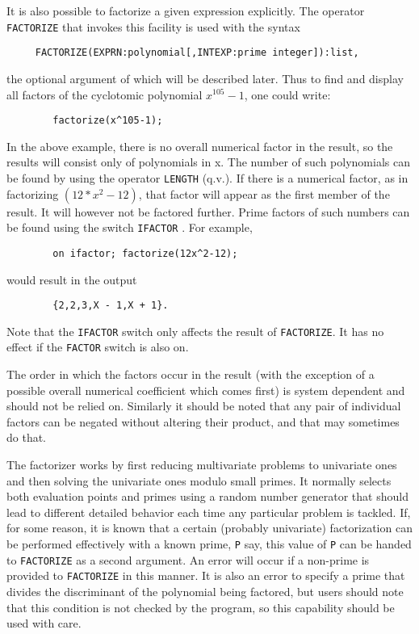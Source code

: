 It is also possible to factorize a given expression explicitly.  The
operator {\tt FACTORIZE}  that invokes this facility is
used with the syntax
\begin{verbatim}
     FACTORIZE(EXPRN:polynomial[,INTEXP:prime integer]):list,
\end{verbatim}
the optional argument of which will be described later. Thus to find and
display all factors of the cyclotomic polynomial $x^{105}-1$, one could
write:
\begin{verbatim}
        factorize(x^105-1);
\end{verbatim}
In the above example, there is no overall numerical factor in the result,
so the results will consist only of polynomials in x.  The number of such
polynomials can be found by using the operator {\tt LENGTH} 
(q.v.).  If there is a numerical factor, as in factorizing
$(12*x^{2}-12)$, that factor will appear as the first member of the
result.  It will however not be factored further.  Prime factors of such
numbers can be found using the switch {\tt IFACTOR} .  For
example,
\begin{verbatim}
        on ifactor; factorize(12x^2-12);
\end{verbatim}
would result in the output
\begin{verbatim}
        {2,2,3,X - 1,X + 1}.
\end{verbatim}
Note that the {\tt IFACTOR} switch only affects the result of {\tt FACTORIZE}.
It has no effect if the {\tt FACTOR}  switch is also on.

The order in which the factors occur in the result (with the exception of
a possible overall numerical coefficient which comes first) is system
dependent and should not be relied on. Similarly it should be noted that
any pair of individual factors can be negated without altering their
product, and that {\REDUCE} may sometimes do that.

The factorizer works by first reducing multivariate problems to univariate
ones and then solving the univariate ones modulo small primes. It normally
selects both evaluation points and primes using a random number generator
that should lead to different detailed behavior each time any particular
problem is tackled. If, for some reason, it is known that a certain
(probably univariate) factorization can be performed effectively with a
known prime, {\tt P} say, this value of {\tt P} can be handed to
{\tt FACTORIZE}  as a second
argument. An error will occur if a non-prime is provided to {\tt FACTORIZE} in
this manner. It is also an error to specify a prime that divides the
discriminant of the polynomial being factored, but users should note that
this condition is not checked by the program, so this capability should be
used with care.

